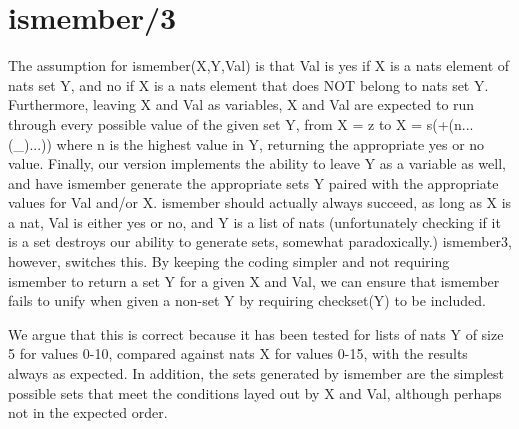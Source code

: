 \documentclass{article}
\begin{document}
\section{ismember/3}
The assumption for ismember(X,Y,Val) is that Val is yes if X is a nats element of nats set Y, and no if X is a nats element that does NOT belong to nats set Y. Furthermore, leaving X and Val as variables, X and Val are expected to run through every possible value of the given set Y, from X = z to X = s(+(n...(\_)...)) where n is the highest value in Y, returning the appropriate yes or no value. Finally, our version implements the ability to leave Y as a variable as well, and have ismember generate the appropriate sets Y paired with the appropriate values for Val and/or X.
ismember should actually always succeed, as long as X is a nat, Val is either yes or no, and Y is a list of nats (unfortunately checking if it is a set destroys our ability to generate sets, somewhat paradoxically.) ismember3, however, switches this. By keeping the coding simpler and not requiring ismember to return a set Y for a given X and Val, we can ensure that ismember fails to unify when given a non-set Y by requiring checkset(Y) to be included.

We argue that this is correct because it has been tested for lists of nats Y of size 5 for values 0-10, compared against nats X for values 0-15, with the results always as expected. In addition, the sets generated by ismember are the simplest possible sets that meet the conditions layed out by X and Val, although perhaps not in the expected order.
\end{document}
